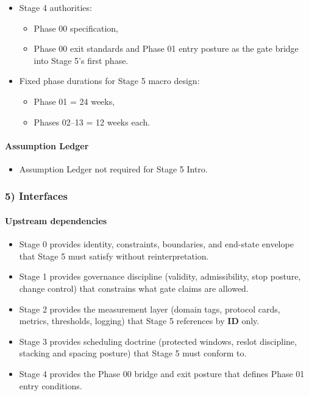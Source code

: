 \documentclass[10pt]{article}
\begin{document}
\begin{itemize}
\item Stage 4 authorities:
  \begin{itemize}
  \item Phase 00 specification,
  \item Phase 00 exit standards and Phase 01 entry posture as the gate bridge into Stage 5’s first phase.
  \end{itemize}
\item Fixed phase durations for Stage 5 macro design:
  \begin{itemize}
  \item Phase 01 = 24 weeks,
  \item Phases 02–13 = 12 weeks each.
  \end{itemize}
\end{itemize}

\paragraph*{Assumption Ledger}

\begin{itemize}
\item Assumption Ledger not required for Stage 5 Intro.
\end{itemize}

\subsubsection*{5) Interfaces}

\paragraph*{Upstream dependencies}

\begin{itemize}
\item Stage 0 provides identity, constraints, boundaries, and end-state envelope that Stage 5 must satisfy without reinterpretation.
\item Stage 1 provides governance discipline (validity, admissibility, stop posture, change control) that constrains what gate claims are allowed.
\item Stage 2 provides the measurement layer (domain tags, protocol cards, metrics, thresholds, logging) that Stage 5 references by \textbf{ID} only.
\item Stage 3 provides scheduling doctrine (protected windows, reslot discipline, stacking and spacing posture) that Stage 5 must conform to.
\item Stage 4 provides the Phase 00 bridge and exit posture that defines Phase 01 entry conditions.
\end{itemize}
\end{document}

